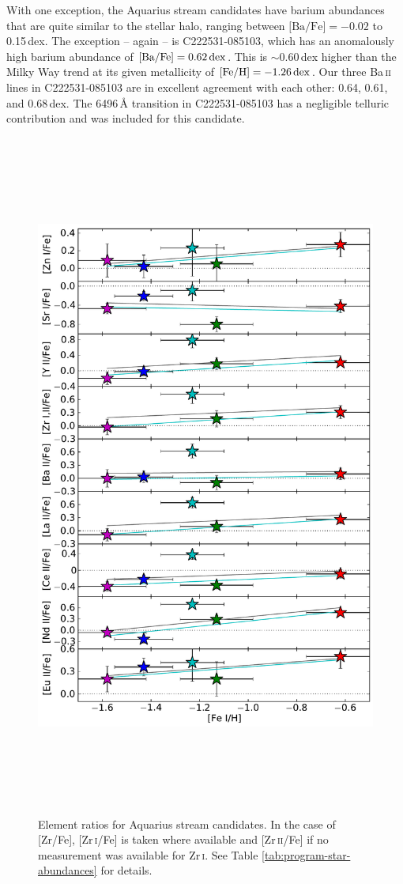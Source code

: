 \documentclass{emulateapj}
\begin{document}
With one exception, the Aquarius stream candidates have barium abundances that are quite similar to the stellar halo, ranging between ${\mbox{[Ba/Fe]} = -0.02}$ to {0.15\,dex}. The exception -- again -- is {C222531-085103}, which has an anomalously high barium abundance of ${\mbox{[Ba/Fe]} = 0.62\,{\rm dex}}$. This is $\sim$0.60\,dex higher than the Milky Way trend at its given metallicity of ${\mbox{[Fe/H]} = -1.26\,{\rm dex}}$. Our three {Ba\,\textsc{ii}} lines in {C222531-085103} are in excellent agreement with each other: 0.64, 0.61, and {0.68\,dex}. The {6496\,\AA} transition in {C222531-085103} has a negligible telluric contribution and was included for this candidate. 

\begin{figure}[h]
	\includegraphics[width=\columnwidth,height=22.6cm]{./figures/plot-x-on-fe.pdf}
	\caption{Element ratios for Aquarius stream candidates. In the case of [Zr/Fe], {[Zr\,\textsc{i}/Fe]} is taken where available and {[Zr\,\textsc{ii}/Fe]} if no measurement was available for {Zr\,\textsc{i}}. See Table \ref{tab:program-star-abundances} for details.}
	\label{fig:x-on-fe}
\end{figure}
\end{document}
